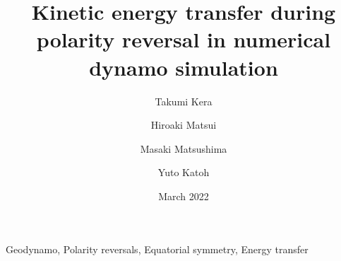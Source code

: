 \documentclass[review]{elsarticle}
\date{March 2022}
\begin{document}
\title{Kinetic energy transfer during polarity reversal in numerical dynamo simulation}

\author[Tohoku]{Takumi Kera}
\author[ucd]{Hiroaki Matsui}
\author[TITECH]{Masaki Matsushima}
\author[Tohoku]{Yuto Katoh}

\address[Tohoku]{Department of Geophysics, Tohoku University, Sendai, Japan.}
\address[ucd]{Department of the Earth and Planetary Sciences, University of California, Davis, CA, USA.}
\address[TITECH]{Department of Earth and Planetary Sciences, Institute of Science Tokyo, Tokyo, Japan.}

\begin{keyword}
Geodynamo, Polarity reversals, Equatorial symmetry, Energy transfer
\end{keyword}
\end{document}
